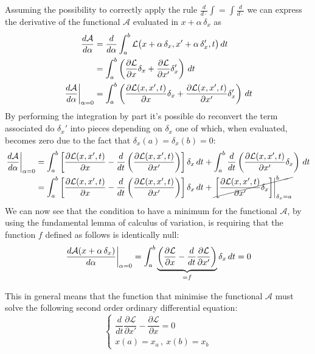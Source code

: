 	Assuming the possibility to correctly apply the rule $\frac{d}{d\cdot} \int = \int \frac{d}{d\cdot}$ we can express the derivative of the functional $\mathcal A$ evaluated in $x+ \alpha\, \delta_x$ as
	\begin{align*}
		\frac{d\mathcal A}{d\alpha} & = \frac{d}{d\alpha} \int_a^b \mathcal L\big( x + \alpha\, \delta_x ,x' + \alpha\, \delta_x', t\big)\, dt \\
		& = \int_a^b \left(\frac{\partial \mathcal L}{\partial x} \delta_x + \frac{\partial \mathcal L}{\partial x'} \delta_x'\right)\, dt \\
		\left. \frac{d\mathcal A}{d\alpha} \right|_{\alpha = 0} & = \int_a^b \left( \frac{\partial \mathcal L(x,x',t)}{\partial x} \delta_x + \frac{\partial \mathcal L(x,x',t)}{\partial x'} \delta_x' \right)\, dt 
	\end{align*}
	By performing the integration by part it's possible do reconvert the term associated do $\delta_x'$ into pieces depending on $\delta_x$ one of which, when evaluated, becomes zero due to the fact that $\delta_x(a) = \delta_x(b) = 0$:
	\begin{align*}
		\left. \frac{d\mathcal A}{d\alpha} \right|_{\alpha = 0} & = \int_a^b \left[ \frac{\partial \mathcal L(x,x',t)}{\partial x} - \frac{d}{dt} \left( \frac{\partial \mathcal L(x,x',t)}{\partial x'} \right) \right] \delta_x\, dt + \int_a^b\frac{d}{dt}\left( \frac{\partial \mathcal L(x,x',t)}{\partial x'}\delta_x \right) \, dt \\
		& = \int_a^b \left[ \frac{\partial \mathcal L(x,x',t)}{\partial x} - \frac{d}{dt} \left( \frac{\partial \mathcal L(x,x',t)}{\partial x'} \right) \right] \delta_x\, dt + \cancel{\left. \left[ \frac{\partial \mathcal L(x,x',t)}{\partial x'}\delta_x \right] \right|_{\delta_x = a}^b} \\
	\end{align*}
	We can now see that the condition to have a minimum for the functional $\mathcal A$, by using the fundamental lemma of calculus of variation, is requiring that the function $f$ defined as follows is identically null:
	\begin{equation}
		\left. \frac{d\mathcal A(x+\alpha\, \delta_x)}{d\alpha} \right|_{\alpha = 0} = \int_a^b \underbrace{\left(\frac{\partial \mathcal L}{\partial x} - \frac d{dt}\frac{\partial \mathcal L}{\partial x'}\right)}_{=f} \delta_x \, dt = 0
	\end{equation}
	
	This in general means that the function that minimise the functional $\mathcal A$ must solve the following second order ordinary differential equation:
	\[ \begin{cases}
		\dfrac d{dt} \dfrac{\partial\mathcal L}{\partial x'} - \dfrac {\partial \mathcal L}{\partial x} = 0 \\ x(a) = x_a \, ,\ x(b) = x_b
	\end{cases} \]
	
